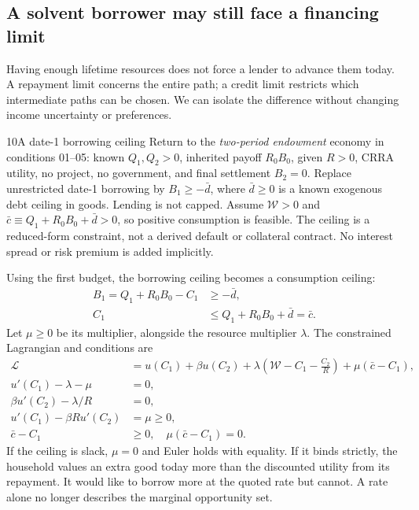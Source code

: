 \subsection{A solvent borrower may still face a financing limit}

Having enough lifetime resources does not force a lender to advance them
today. A repayment limit concerns the entire path; a credit limit restricts
which intermediate paths can be chosen. We can isolate the difference
without changing income uncertainty or preferences.

\begin{modelsetup}[1]
\begin{modelcondition}{10}{A date-1 borrowing ceiling}
Return to the \emph{two-period endowment} economy in conditions 01--05:
known $Q_1,Q_2>0$, inherited payoff $R_0B_0$, given $R>0$, CRRA utility,
no project, no government, and final settlement $B_2=0$.
Replace unrestricted date-1 borrowing by $B_1\geq-\bar d$, where
$\bar d\geq0$ is a known exogenous debt ceiling in goods. Lending is not
capped. Assume $\mathcal W>0$ and
$\bar c\equiv Q_1+R_0B_0+\bar d>0$, so positive consumption is feasible.
The ceiling is a reduced-form constraint, not a derived default or collateral
contract. No interest spread or risk premium is added implicitly.
\end{modelcondition}
\end{modelsetup}

Using the first budget, the borrowing ceiling becomes a consumption ceiling:
\begin{align}
 B_1=Q_1+R_0B_0-C_1&\geq-\bar d,\\
 C_1&\leq Q_1+R_0B_0+\bar d=\bar c.
\end{align}
Let $\mu\geq0$ be its multiplier, alongside the resource multiplier $\lambda$.
The constrained Lagrangian and conditions are
\begin{align}
 \mathcal L&=u(C_1)+\beta u(C_2)
 +\lambda\left(\mathcal W-C_1-\frac{C_2}{R}\right)
 +\mu(\bar c-C_1),\\
 u'(C_1)-\lambda-\mu&=0,\\
 \beta u'(C_2)-\lambda/R&=0,\\
 u'(C_1)-\beta R u'(C_2)&=\mu\geq0,\label{eq:open-credit-euler}\\
 \bar c-C_1&\geq0,\quad \mu(\bar c-C_1)=0.
\end{align}
If the ceiling is slack, $\mu=0$ and Euler holds with equality. If it binds
strictly, the household values an extra good today more than the discounted
utility from its repayment. It would like to borrow more at the quoted rate
but cannot. A rate alone no longer describes the marginal opportunity set.

